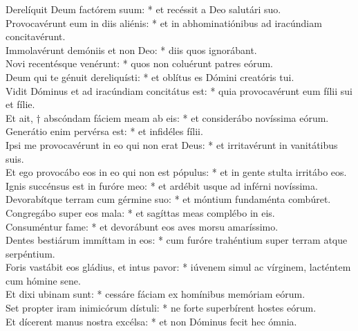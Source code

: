 {	Derelíquit Deum factórem suum: * et recéssit a Deo salutári suo. \\
	Provocavérunt eum in diis aliénis: * et in abhominatiónibus ad iracúndiam concitavérunt. \\
	Immolavérunt demóniis et non Deo: * diis quos ignorábant. \\
	Novi recentésque venérunt: * quos non coluérunt patres eórum. \\
	Deum qui te génuit dereliquísti: * et oblítus es Dómini
creatóris tui. \\
	Vidit Dóminus et ad iracúndiam concitátus est: * quia provocavérunt eum fílii sui et fílie. \\
	Et ait, † abscóndam fáciem meam ab eis: * et considerábo novíssima eórum. \\
	Generátio enim pervérsa est: * et infidéles fílii. \\
	Ipsi me provocavérunt in eo qui non erat Deus: * et irritavérunt in vanitátibus suis. \\
	Et ego provocábo eos in eo qui non est pópulus: * et in gente stulta irritábo eos. \\
	Ignis succénsus est in furóre meo: * et ardébit usque ad inférni novíssima. \\
	Devorabítque terram cum gérmine suo: * et móntium fundaménta combúret. \\
	Congregábo super eos mala: * et sagíttas meas complébo in eis. \\
	Consuméntur fame: * et devorábunt eos aves morsu amaríssimo. \\
	Dentes bestiárum immíttam in eos: * cum furóre trahéntium super terram atque serpéntium. \\
	Foris vastábit eos gládius, et intus pavor: * iúvenem simul ac vírginem, lacténtem cum hómine sene. \\
	Et dixi ubinam sunt: * cessáre fáciam ex homínibus memóriam eórum. \\
	Set propter iram inimicórum dístuli: * ne forte superbírent hostes eórum. \\
	Et dícerent manus nostra excélsa: * et non Dóminus fecit hec ómnia. \\
}
